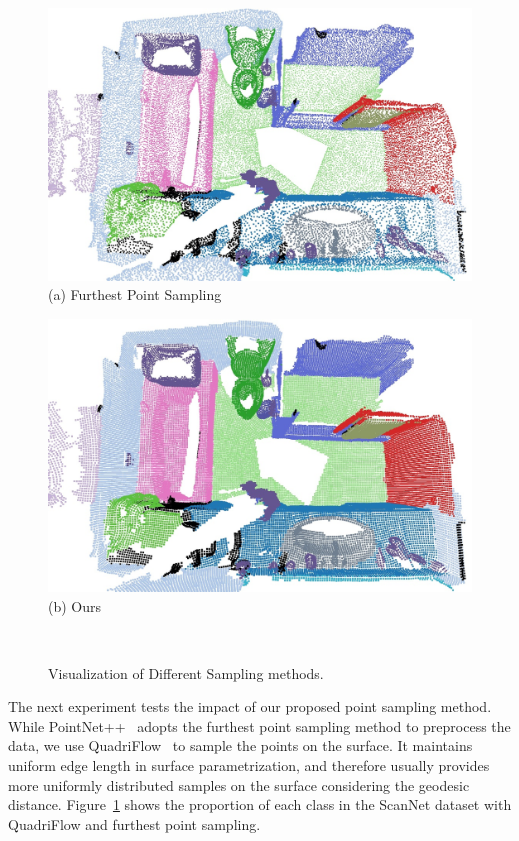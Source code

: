 \begin{figure}[h]
    \centering
    \begin{minipage}{0.4\linewidth}
    \centering
    \includegraphics[width=\linewidth]{texturenet/sampling/sampling_fps00.jpg}
    (a) Furthest Point Sampling
    \end{minipage}
    \begin{minipage}{0.4\linewidth}
    \centering
    \includegraphics[width=\linewidth]{texturenet/sampling/sampling_ours00.jpg}
    (b) Ours
    \end{minipage}\\
    \vspace{0.1cm}
    \caption{Visualization of Different Sampling methods.}
    \label{fig:texturenet-sampling}
\end{figure}

The next experiment tests the impact of our proposed point sampling method.  While PointNet++~\cite{qi2017pointnet++} adopts the furthest point sampling method to preprocess the data, we use QuadriFlow~\cite{huang2018quadriflow} to sample the points on the surface. It maintains uniform edge length in surface parametrization, and therefore usually provides more uniformly distributed samples on the surface considering the geodesic distance. Figure~\ref{fig:texturenet-sampling} shows the proportion of each class in the ScanNet dataset with QuadriFlow and furthest point sampling.

